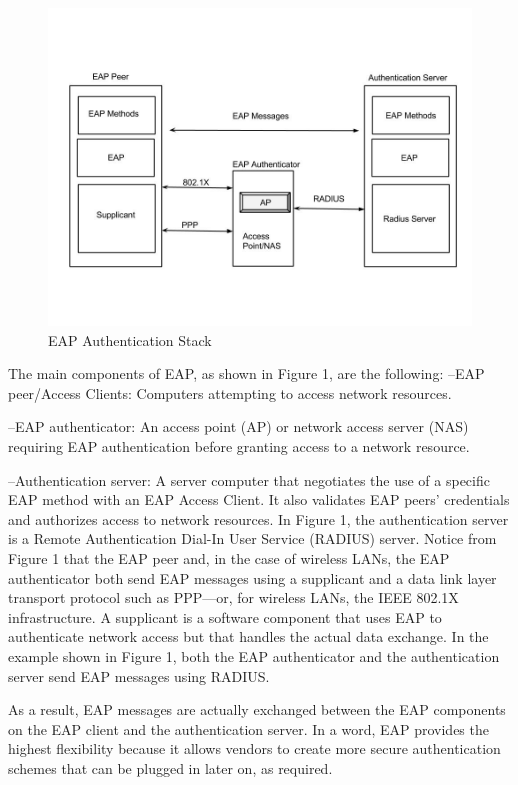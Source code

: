 \begin{figure}[htb]
\centering	
\includegraphics[width=1\textwidth]{images/EAP_overview.jpg}
\caption{EAP Authentication Stack} 
\label{fig:EAP Authentication Stack}
\end{figure}

The main components of EAP, as shown in Figure 1, are the following:
--EAP peer/Access Clients: Computers attempting to access network resources.

--EAP authenticator: An access point (AP) or network access server (NAS) requiring EAP authentication before granting access to a network resource.

--Authentication server: A server computer that negotiates the use of a specific EAP method with an EAP Access Client. It also validates EAP peers’ credentials and authorizes access to network resources. In Figure 1, the authentication server is a Remote Authentication Dial-In User Service (RADIUS) server. Notice from Figure 1 that the EAP peer and, in the case of wireless LANs, the EAP authenticator both send EAP messages using a supplicant and a data link layer transport protocol such as PPP—or, for wireless LANs, the IEEE 802.1X infrastructure. A supplicant is a software component that uses EAP to authenticate network access but that handles the actual data exchange. In the example shown in Figure 1, both the EAP authenticator and the authentication server send EAP messages using
RADIUS. 

As a result, EAP messages are actually exchanged between the EAP components on the EAP client and the authentication server. In a word, EAP provides the highest flexibility because it allows vendors to create more secure authentication schemes that can be plugged in later on, as required.

